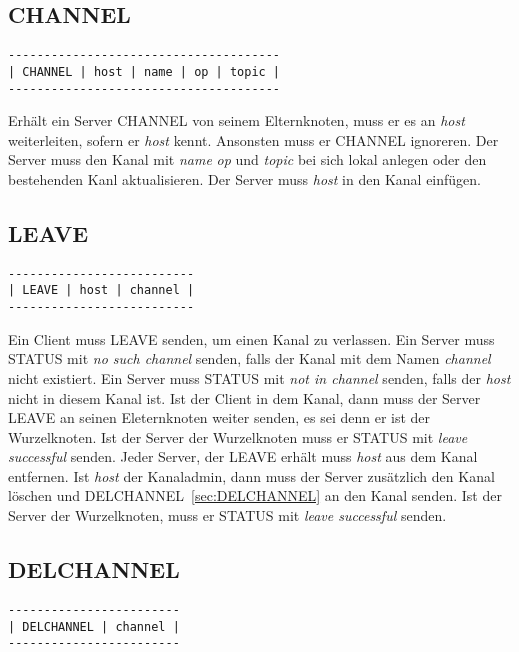 \documentclass{article}
\begin{document}
\subsection{CHANNEL}

\begin{lstlisting}
--------------------------------------
| CHANNEL | host | name | op | topic |
--------------------------------------
\end{lstlisting}

Erhält ein Server CHANNEL von seinem Elternknoten, muss er es an \emph{host} weiterleiten, sofern er \emph{host} kennt.
Ansonsten muss er CHANNEL ignoreren.
Der Server muss den Kanal mit \emph{name} \emph{op} und \emph{topic} bei sich lokal anlegen oder den bestehenden Kanl aktualisieren.
Der Server muss \emph{host} in den Kanal einfügen.

\subsection{LEAVE}

\begin{lstlisting}
--------------------------
| LEAVE | host | channel |
--------------------------
\end{lstlisting}

Ein Client muss LEAVE senden, um einen Kanal zu verlassen.
Ein Server muss STATUS mit \emph{no such channel} senden, falls der Kanal mit dem Namen \emph{channel} nicht existiert.
Ein Server muss STATUS mit \emph{not in channel} senden, falls der \emph{host} nicht in diesem Kanal ist.
Ist der Client in dem Kanal, dann muss der Server LEAVE an seinen Eleternknoten weiter senden, es sei denn er ist der Wurzelknoten. 
Ist der Server der Wurzelknoten muss er STATUS mit \emph{leave successful} senden.
Jeder Server, der LEAVE erhält muss \emph{host} aus dem Kanal entfernen.
Ist \emph{host} der Kanaladmin, dann muss der Server zusätzlich den Kanal löschen und DELCHANNEL~\ref{sec:DELCHANNEL} an den Kanal senden.
Ist der Server der Wurzelknoten, muss er STATUS mit \emph{leave successful} senden.

\subsection{DELCHANNEL}

\begin{lstlisting}
------------------------
| DELCHANNEL | channel |
------------------------
\end{lstlisting}
\end{document}
